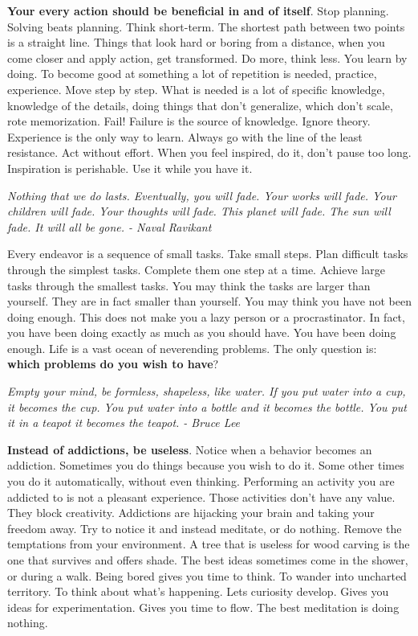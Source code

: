 \documentclass[a4paper,hidelinks]{article}
\begin{document}
\textbf{Your every action should be beneficial in and of itself}.
Stop planning.
Solving beats planning.
Think short-term.
The shortest path between two points is a straight line.
Things that look hard or boring from a distance, when you come closer and apply action, get transformed.
Do more, think less.
You learn by doing.
To become good at something a lot of repetition is needed, practice, experience.
Move step by step.
What is needed is a lot of specific knowledge, knowledge of the details, doing things that don't generalize, which don't scale, rote memorization.
Fail!
Failure is the source of knowledge.
Ignore theory.
Experience is the only way to learn.
Always go with the line of the least resistance.
Act without effort.
When you feel inspired, do it, don't pause too long.
Inspiration is perishable.
Use it while you have it.

\newpage

\begin{center}
\textit{
Nothing that we do lasts. Eventually, you will fade. Your works will fade. Your children will fade. Your thoughts will fade. This planet will fade. The sun will fade. It will all be gone. - Naval Ravikant
}
\end{center}

Every endeavor is a sequence of small tasks.
Take small steps.
Plan difficult tasks through the simplest tasks.
Complete them one step at a time.
Achieve large tasks through the smallest tasks.
You may think the tasks are larger than yourself.
They are in fact smaller than yourself.
You may think you have not been doing enough.
This does not make you a lazy person or a procrastinator.
In fact, you have been doing exactly as much as you should have.
You have been doing enough.
Life is a vast ocean of neverending problems.
The only question is: \textbf{which problems do you wish to have}?

\newpage

\begin{center}
\textit{
Empty your mind, be formless, shapeless, like water. If you put water into a cup, it becomes the cup. You put water into a bottle and it becomes the bottle. You put it in a teapot it becomes the teapot. - Bruce Lee
}
\end{center}

\textbf{Instead of addictions, be useless}.
Notice when a behavior becomes an addiction.
Sometimes you do things because you wish to do it.
Some other times you do it automatically, without even thinking.
Performing an activity you are addicted to is not a pleasant experience.
Those activities don't have any value.
They block creativity.
Addictions are hijacking your brain and taking your freedom away.
Try to notice it and instead meditate, or do nothing.
Remove the temptations from your environment.
A tree that is useless for wood carving is the one that survives and offers shade.
The best ideas sometimes come in the shower, or during a walk.
Being bored gives you time to think.
To wander into uncharted territory.
To think about what's happening.
Lets curiosity develop.
Gives you ideas for experimentation.
Gives you time to flow.
The best meditation is doing nothing.
\end{document}
